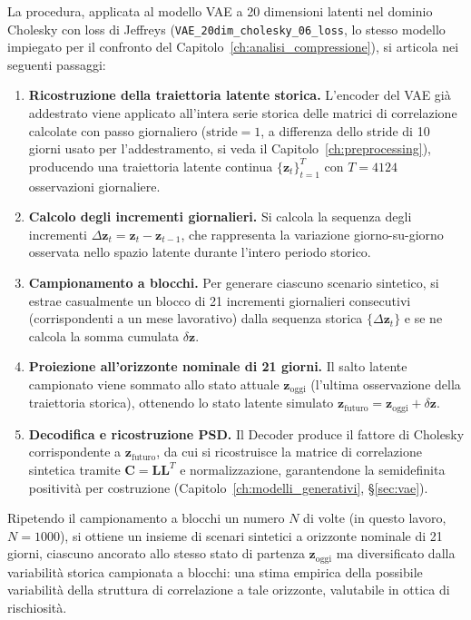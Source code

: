 La procedura, applicata al modello VAE a 20 dimensioni latenti nel dominio Cholesky con loss di Jeffreys (\texttt{VAE\_20dim\_cholesky\_06\_loss}, lo stesso modello impiegato per il confronto del Capitolo~\ref{ch:analisi_compressione}), si articola nei seguenti passaggi:
\begin{enumerate}
    \item \textbf{Ricostruzione della traiettoria latente storica.} L'encoder del VAE già addestrato viene applicato all'intera serie storica delle matrici di correlazione calcolate con passo giornaliero ($\text{stride}=1$, a differenza dello stride di 10 giorni usato per l'addestramento, si veda il Capitolo~\ref{ch:preprocessing}), producendo una traiettoria latente continua $\{\mathbf{z}_t\}_{t=1}^{T}$ con $T=4124$ osservazioni giornaliere.
    \item \textbf{Calcolo degli incrementi giornalieri.} Si calcola la sequenza degli incrementi $\Delta\mathbf{z}_t = \mathbf{z}_t - \mathbf{z}_{t-1}$, che rappresenta la variazione giorno-su-giorno osservata nello spazio latente durante l'intero periodo storico.
    \item \textbf{Campionamento a blocchi.} Per generare ciascuno scenario sintetico, si estrae casualmente un blocco di 21 incrementi giornalieri consecutivi (corrispondenti a un mese lavorativo) dalla sequenza storica $\{\Delta\mathbf{z}_t\}$ e se ne calcola la somma cumulata $\delta\mathbf{z}$.
    \item \textbf{Proiezione all'orizzonte nominale di 21 giorni.} Il salto latente campionato viene sommato allo stato attuale $\mathbf{z}_{\text{oggi}}$ (l'ultima osservazione della traiettoria storica), ottenendo lo stato latente simulato $\mathbf{z}_{\text{futuro}} = \mathbf{z}_{\text{oggi}} + \delta\mathbf{z}$.
    \item \textbf{Decodifica e ricostruzione PSD.} Il Decoder produce il fattore di Cholesky corrispondente a $\mathbf{z}_{\text{futuro}}$, da cui si ricostruisce la matrice di correlazione sintetica tramite $\mathbf{C} = \mathbf{L}\mathbf{L}^T$ e normalizzazione, garantendone la semidefinita positività per costruzione (Capitolo~\ref{ch:modelli_generativi}, \S\ref{sec:vae}).
\end{enumerate}

Ripetendo il campionamento a blocchi un numero $N$ di volte (in questo lavoro, $N=1000$), si ottiene un insieme di scenari sintetici a orizzonte nominale di 21 giorni, ciascuno ancorato allo stesso stato di partenza $\mathbf{z}_{\text{oggi}}$ ma diversificato dalla variabilità storica campionata a blocchi: una stima empirica della possibile variabilità della struttura di correlazione a tale orizzonte, valutabile in ottica di rischiosità.

